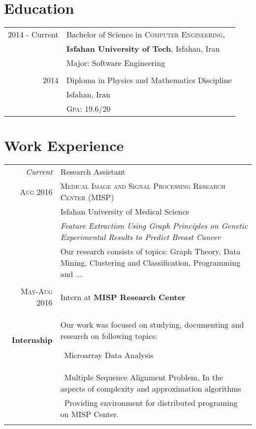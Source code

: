 \documentclass[a4paper,10pt]{article}
\begin{document}
\section{Education}
\begin{tabular}{rl}	
	2014 - Current & Bachelor of Science in \textsc{Computer Engineering}, \\  & \textbf{Isfahan University of Tech}, Isfahan, Iran\\
	& Major: Software Engineering\\
	
	\\
	
	2014 & Diploma in Physics and Mathematics Discipline\\&\normalsize Isfahan, Iran \\
	& \normalsize \textsc{Gpa}: 19.6/20
\end{tabular}


\section{Work Experience}
\begin{tabular}{r|p{11cm}}
 \emph{Current} & Research Assistant \\ \textsc{Aug 2016} & \textsc{Medical Image and Signal Processing Research Center} (MISP) \\ & Isfahan University of Medical Science \\ & \emph{Feature Extraction Using Graph Principles on Genetic Experimental Results to Predict Breast Cancer}\\&\footnotesize{Our research consists of topics: Graph Theory, Data Mining, Clustering and Classification, Programming and ...}\\\multicolumn{2}{c}{} \\


 \textsc{May-Aug 2016} & Intern at \textbf{MISP Research Center} \\ \textbf{Internship} & 
 	Our work was focused on studying, documenting and research on following topics:
 	
 		\textbullet \ Microarray Data Analysis\\
 		& \textbullet \ Multiple Sequence Alignment Problem, In the aspects of complexity and approximation algorithms\\
 		& \textbullet \ Providing environment for distributed programing on MISP Center.
 	
 	
 	
 	\\\multicolumn{2}{c}{} \\

\end{tabular}
\end{document}
